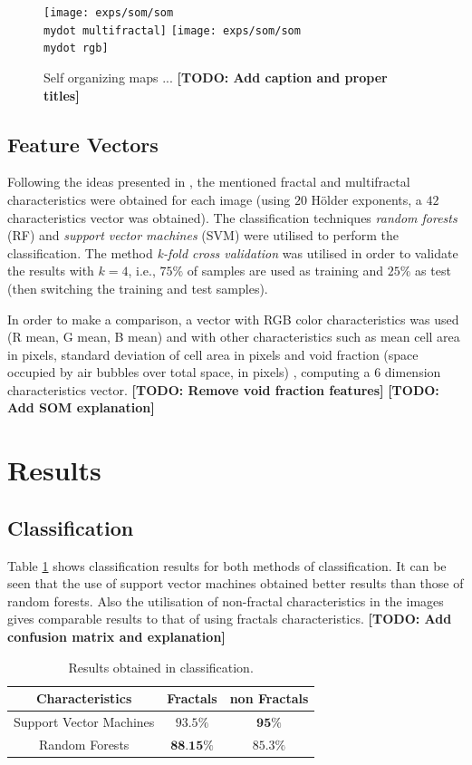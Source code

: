 \documentclass[oneside,a4paper,english,links]{amca}
\newcommand{\mydot}{.}
\newcommand{\todo}[1]{\textbf{[TODO: #1]}}
\begin{document}
\begin{figure}[]
\centering
\texttt{[image: exps/som/som\\mydot multifractal]}
\texttt{[image: exps/som/som\\mydot rgb]}
\caption{Self organizing maps ... \todo{Add caption and proper titles}}
\label{fig:soms}
\end{figure}


\subsection{Feature Vectors}
Following the ideas presented in \cite{Gonzales2008}, the mentioned fractal and multifractal characteristics were obtained for each image (using $20$ H\"older exponents, a $42$ characteristics vector was obtained). The classification techniques {\em random forests} (RF) \cite{Breiman2001} and {\em support vector machines} (SVM) \cite{Boser92} were utilised to perform the classification. The method {\em k-fold cross validation} was utilised in order to validate the results with $k = 4$, i.e., $75\%$ of samples are used as training and $25\%$ as test (then switching the training and test samples).

In order to make a comparison, a vector with RGB color characteristics was used (R mean, G mean, B mean) and with other characteristics such as mean cell area in pixels, standard deviation of cell area in pixels and void fraction (space occupied by air bubbles over total space, in pixels) \cite{Gonzales2008}, computing a $6$ dimension characteristics vector. \todo{Remove void fraction features} \todo{Add SOM explanation}


\section{Results}

\subsection{Classification}
Table \ref{table:table1} shows classification results for both methods of classification. It can be seen that the use of support vector machines obtained better results than those of random forests. Also the utilisation of non-fractal characteristics in the images gives comparable results to that of using fractals characteristics.
\todo{Add confusion matrix and explanation}

\begin{table}[htb]
\centering
\begin{tabular}{|c|c|c|}
    \hline
    Characteristics & Fractals & non Fractals\\
    \hline
    Support Vector Machines  & $93.5\%$ & $\textbf{95\%}$\\
    \hline
    Random Forests & $\textbf{88.15\%}$  & $85.3\%$\\
    \hline
\end{tabular}
\caption{Results obtained in classification. }
\label{table:table1}
\end{table}
\end{document}
